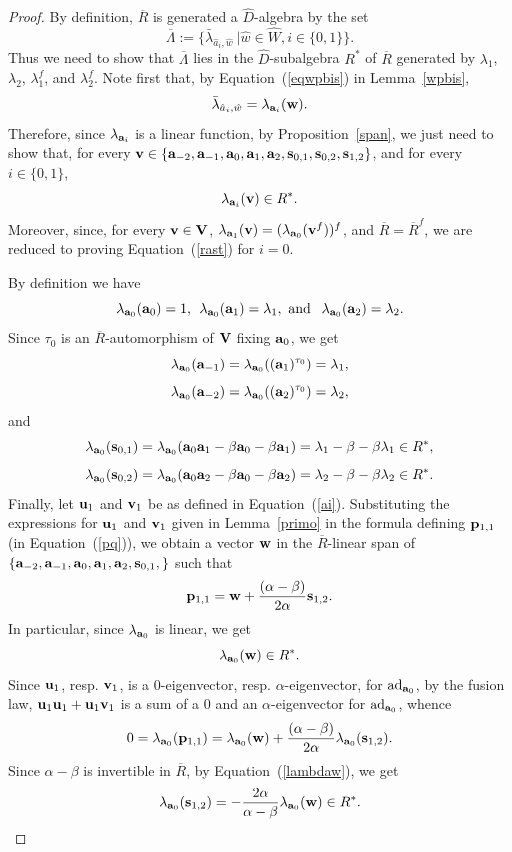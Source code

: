 \documentclass[a4paper]{amsart}
\newcommand{\Ro}{{\overline R}}
\newcommand{\Vo}{{\bf V}}
\newcommand{\ad}{{\rm ad}}
\newcommand{\al}{\alpha}
\newcommand{\bt}{\beta}
\newcommand{\bv}{{\bf v}}
\newcommand{\ba}{{\bf a}}
\newcommand{\bw}{{\bf w}}
\newcommand{\bu}{{\bf u}}
\newcommand{\bs}{{\bf s}}
\newcommand{\bp}{{\bf p}}
\begin{document}
\begin{proof}
By definition, $\Ro$ is generated a $\hat D$-algebra by the set
$$
\overline{\Lambda}:=\{ {\bar \lambda}_{\hat a_i, \hat w}\: | \hat w\in \hat W, i\in \{0,1\}\}.
$$
Thus we need to show that $\overline{\Lambda}$ lies in the $\hat D$-subalgebra $R^\ast$ of $\Ro$ generated by $\lambda_1$, $\lambda_2$,  $\lambda_1^f$, and $\lambda_2^f$.
Note first that, by Equation~(\ref{eqwpbis}) in Lemma~\ref{wpbis}, 
$$
{\bar \lambda}_{\hat a_i, \hat w}=\lambda_{\ba_i}(\bw).
$$
Therefore, since $\lambda_{\ba_i}$ is a linear function,   by Proposition~\ref{span}, we just need to show that, for every $\bv\in \{ \ba_{-2}, \ba_{-1}, \ba_0, \ba_1, \ba_2, \bs_{0,1}, \bs_{0,2}, \bs_{1,2}\}$,  and for every $i\in \{0,1\}$,
\begin{equation}\label{rast}
\lambda_{\ba_i}(\bv)\in R^\ast.
\end{equation} 
Moreover, since,  for every $\bv\in \Vo$, $\lambda_{\ba_1}(\bv)=(\lambda_{\ba_0}(\bv^f))^f$, and $\Ro=\Ro^f$, we are reduced to proving Equation~(\ref{rast}) for $i=0$.

By definition we have 
$$\lambda_{\ba_0}(\ba_0)=1, \:\:\lambda_{\ba_0}(\ba_1)=\lambda_1,\mbox{ and }\:\:\lambda_{\ba_0}(\ba_2)=\lambda_2.$$ Since $\tau_0$  is an $\Ro$-automorphism of $\Vo$ fixing $\ba_0$, we get
$$\lambda_{\ba_0}(\ba_{-1})=\lambda_{\ba_0}((\ba_{1})^{\tau_0})=\lambda_1,$$
$$\lambda_{\ba_0}(\ba_{-2})=\lambda_{\ba_0}((\ba_{2})^{\tau_0})=\lambda_2,$$
 and 
$$
\lambda_{\ba_0}(\bs_{0,1})=\lambda_{\ba_0}(\ba_0\ba_1-\beta \ba_0-\beta \ba_1)=\lambda_1-\beta-\beta \lambda_1\in R^\ast,
$$
$$
\lambda_{\ba_0}(\bs_{0,2})=\lambda_{\ba_0}(\ba_0\ba_2-\beta \ba_0-\beta \ba_2)=\lambda_2-\beta-\beta \lambda_2\in R^\ast.
$$
Finally, let $\bu_1$ and $\bv_1$ be as defined in Equation~(\ref{ai}). Substituting the expressions for $\bu_1$ and $\bv_1$ given in Lemma~\ref{primo} in the formula defining  $\bp_{1,1}$ (in Equation~(\ref{pq})), we obtain a vector $\bw$ in the $\Ro$-linear span of $\{ \ba_{-2}, \ba_{-1}, \ba_0, \ba_1, \ba_2, \bs_{0,1}, \}$ such that
\begin{equation}\label{asin2}
\bp_{1,1}=\bw+\frac{(\al-\bt)}{2\al}\bs_{1,2}.
\end{equation}
In particular, since $\lambda_{\ba_0}$ is linear, we get 
\begin{equation}\label{lambdaw}
\lambda_{\ba_0}(\bw)\in R^\ast.
\end{equation}
Since $\bu_1$, resp. $\bv_1$, is a $0$-eigenvector, resp. $\alpha$-eigenvector, for $\ad_{\ba_0}$, by the fusion law, $\bu_1\bu_1+\bu_1\bv_1$ is a sum of a $0$ and an $\al$-eigenvector for $\ad_{\ba_0}$, whence 
$$0=\lambda_{\ba_0}(\bp_{1,1})=
\lambda_{\ba_0}(\bw)+\frac{(\al-\bt)}{2\al}\lambda_{\ba_0}(\bs_{1,2}).
$$
Since $\al-\bt$ is invertible in $\Ro$, by Equation~(\ref{lambdaw}), we get  
$$
\lambda_{\ba_0}(\bs_{1,2})=-\frac{2\al}{\al-\bt}\lambda_{\ba_0}(\bw)\in R^\ast.
$$
\end{proof}
\end{document}
